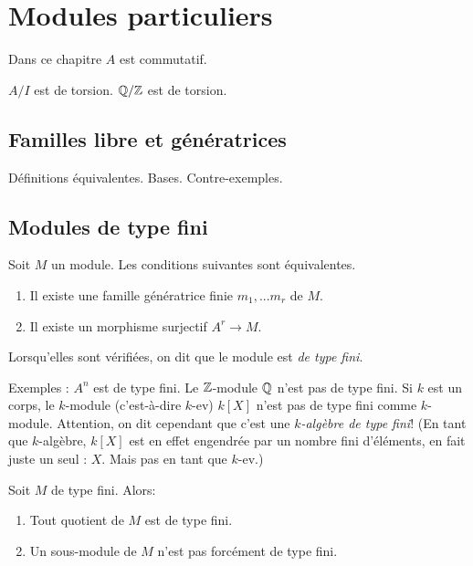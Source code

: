 

\chapter{Modules particuliers}

Dans ce chapitre $A$ est commutatif.



$A/I$ est de torsion. $\mathbb{Q}/\mathbb{Z}$ est de torsion.


\section{Familles libre et génératrices}

Définitions équivalentes. 
Bases.
Contre-exemples.




\section{Modules de type fini}

\begin{propdef} Soit $M$ un module. Les conditions suivantes sont équivalentes.
\begin{enumerate}
\item Il existe une famille génératrice finie $m_1, ... m_r$ de $M$.
\item Il existe un morphisme surjectif $A^r \to M$.
\end{enumerate}

Lorsqu'elles sont vérifiées, on dit que le module est \emph{de type fini}.
\end{propdef}

Exemples : $A^n$ est de type fini. Le $\mathbb{Z}$-module $\mathbb{Q}$ n'est pas de type fini. Si $k$ est un corps, le $k$-module (c'est-à-dire $k$-ev) $k[X]$ n'est pas de type fini comme $k$-module. Attention, on dit cependant que c'est une \emph{$k$-algèbre de type fini}! (En tant que $k$-algèbre, $k[X]$ est en effet engendrée par un nombre fini d'éléments, en fait juste un seul : $X$. Mais pas en tant que $k$-ev.)

\begin{proposition}  Soit $M$ de type fini. Alors:
\begin{enumerate}
\item Tout quotient de $M$ est de type fini.
\item Un sous-module de $M$ n'est pas forcément de type fini.
\end{enumerate}
\end{proposition}



